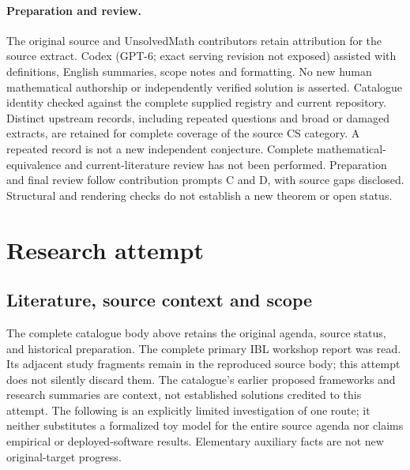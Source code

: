 \documentclass[11pt]{article}
\begin{document}
\paragraph{Preparation and review.}
The original source and UnsolvedMath contributors retain attribution for the source extract. Codex (GPT-6; exact serving revision not exposed) assisted with definitions, English summaries, scope notes and formatting. No new human mathematical authorship or independently verified solution is asserted. Catalogue identity checked against the complete supplied registry and current repository. Distinct upstream records, including repeated questions and broad or damaged extracts, are retained for complete coverage of the source CS category. A repeated record is not a new independent conjecture. Complete mathematical-equivalence and current-literature review has not been performed. Preparation and final review follow contribution prompts C and D, with source gaps disclosed. Structural and rendering checks do not establish a new theorem or open status.
\label{end:statement}

\section{Research attempt}
\subsection{Literature, source context and scope}
The complete catalogue body above retains the original agenda, source status, and historical preparation. The complete primary IBL workshop report was read. Its adjacent study fragments remain in the reproduced source body; this attempt does not silently discard them. The catalogue's earlier proposed frameworks and research summaries are context, not established solutions credited to this attempt. The following is an explicitly limited investigation of one route; it neither substitutes a formalized toy model for the entire source agenda nor claims empirical or deployed-software results. Elementary auxiliary facts are not new original-target progress.
\end{document}
